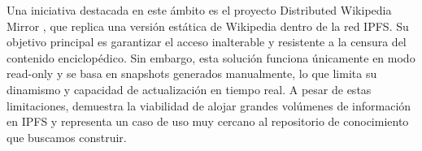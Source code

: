 Una iniciativa destacada en este ámbito es el proyecto Distributed Wikipedia Mirror \cite{distributed-wikipedia-mirror}, que replica una versión estática de Wikipedia dentro de la red IPFS. Su objetivo principal es garantizar el acceso inalterable y resistente a la censura del contenido enciclopédico. Sin embargo, esta solución funciona únicamente en modo read-only y se basa en snapshots generados manualmente, lo que limita su dinamismo y capacidad de actualización en tiempo real. A pesar de estas limitaciones, demuestra la viabilidad de alojar grandes volúmenes de información en IPFS y representa un caso de uso muy cercano al repositorio de conocimiento que buscamos construir.